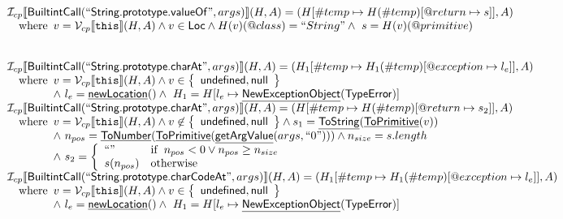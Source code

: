 \documentclass{article}
\makeatletter
\newcommand{\SF}[1]{\mbox{\textsf{#1}}}
\newcommand{\TT}[1]{\mbox{\texttt{#1}}}
\newcommand{\wherec}[1]{{\rm where}\begin{array}[t]{l}#1\end{array}}
\newcommand{\ifc}[1]{{\rm if}\begin{array}[t]{l}#1\end{array}}
\newcommand{\owc}{{\rm otherwise}}
\newcommand{\I}{\mathcal{I}}
\newcommand{\V}{\mathcal{V}}
\newcommand{\set}[1]{\left\{\begin{array}{l}#1\end{array}\right\}}
\newcommand{\lbr}{\llbracket}
\newcommand{\rbr}{\rrbracket}
\newcommand{\hf}[1]{\underline{\sf #1}}
\newcommand{\varloc}[1]{\##1}
\newcommand{\varprop}[1]{@#1}
\makeatother
\begin{document}
\[\begin{array}{l}
\I _{cp}\lbr \SF{BuiltintCall}(``\SF{String.prototype.valueOf}",args)\rbr(H,A)
 = (H[\varloc{temp}\mapsto H(\varloc{temp})[\varprop{return}\mapsto s]], A) \\
\quad\wherec{ 
  v = \V _{cp}\lbr \TT{this}\rbr (H,A) \land v \in \SF{Loc} \land H(v)(@class) = ``String"
  \land\ s = H(v)(\varprop{primitive})
  }\\
\\\\



\I _{cp}\lbr \SF{BuiltintCall}(``\SF{String.prototype.charAt}",args)\rbr(H,A)
 = (H_1[\varloc{temp}\mapsto H_1(\varloc{temp})[\varprop{exception}\mapsto l_e]], A) \\
\quad\wherec{
  v = \V _{cp}\lbr \TT{this}\rbr (H,A) \land v \in \set{\SF{undefined}, \SF{null}}\\
  \land\ l_e = \hf{newLocation}() \land\ H_1=H[l_e\mapsto\hf{NewExceptionObject}(\SF{TypeError})] 
  }\\
  
\I _{cp}\lbr \SF{BuiltintCall}(``\SF{String.prototype.charAt}",args)\rbr(H,A)
 = (H[\varloc{temp}\mapsto H(\varloc{temp})[\varprop{return}\mapsto s_2]], A) \\
\quad\wherec{
  v = \V _{cp}\lbr \TT{this}\rbr (H,A) \land v \not\in \set{\SF{undefined}, \SF{null}}
  \land s_1 = \hf{ToString}(\hf{ToPrimitive}(v))\\
  \land\ n_{pos} = \hf{ToNumber}(\hf{ToPrimitive}(\hf{getArgValue}(args, ``0"))) \land n_{size} = s.length\\
  \land\ s_2 = \left\{\begin{array}{ll}
      ``"& \ifc{n_{pos} < 0 \lor n_{pos} \geq n_{size}}\\
      s(n_{pos}) & \owc\\
    \end{array}\right.
  }\\

\I _{cp}\lbr \SF{BuiltintCall}(``\SF{String.prototype.charCodeAt}",args)\rbr(H,A)
 = (H_1[\varloc{temp}\mapsto H_1(\varloc{temp})[\varprop{exception}\mapsto l_e]], A) \\
\quad\wherec{
  v = \V _{cp}\lbr \TT{this}\rbr (H,A) \land v \in \set{\SF{undefined}, \SF{null}}\\
  \land\ l_e = \hf{newLocation}() \land\ H_1=H[l_e\mapsto\hf{NewExceptionObject}(\SF{TypeError})] 
  }\\
  

\end{array}\]
\end{document}
